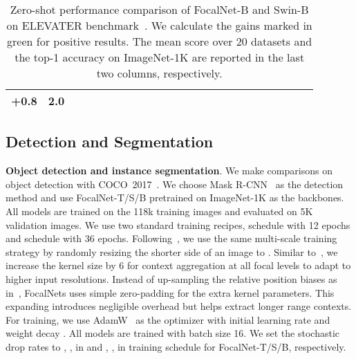 \documentclass{article}
\begin{document}
\begin{table}[t]
{\begin{tabular}{cc|cccccccccccccccccccc|c|c}
        \hspace{-0.9em}\textcolor{green!50!black}{\bf+0.8}\hspace{-0.4em} &  
        \hspace{-0.9em}\textcolor{green!50!black}{\bf2.0}\hspace{-0.4em}   
        \\    
\bottomrule[1.0pt]	
\end{tabular}}
\caption{Zero-shot performance comparison of FocalNet-B and Swin-B on ELEVATER benchmark~\cite{li2022elevater}. We calculate the gains marked in green for positive results. The mean score over 20 datasets and the top-1 accuracy on ImageNet-1K are reported in the last two columns, respectively.}
\label{tab:elevater_icinw}
\vspace{-0mm}
\end{table}

\subsection{Detection and Segmentation}











\textbf{Object detection and instance segmentation}. We make comparisons on object detection with COCO~2017~\cite{lin2014microsoft}. We choose Mask R-CNN~\cite{he2017mask} as the detection method and use FocalNet-T/S/B pretrained on ImageNet-1K as the backbones. All models are trained on the 118k training images and evaluated on 5K validation images. 
We use two standard training recipes,  schedule with 12 epochs and  schedule with 36 epochs. Following~\cite{liu2021swin}, we use the same multi-scale training strategy by randomly resizing the shorter side of an image to . Similar to~\cite{yang2021focal}, we increase the kernel size  by 6 for context aggregation at all focal levels to adapt to higher input resolutions. Instead of up-sampling the relative position biases as in~\cite{yang2021focal}, FocalNets uses simple zero-padding for the extra kernel parameters. This expanding introduces negligible overhead but helps extract longer range contexts. For training, we use AdamW~\cite{loshchilov2017decoupled} as the optimizer with initial learning rate  and weight decay . All models are trained with batch size 16. We set the stochastic drop rates to , ,  in  and , ,  in  training schedule for FocalNet-T/S/B, respectively. 
\end{document}
